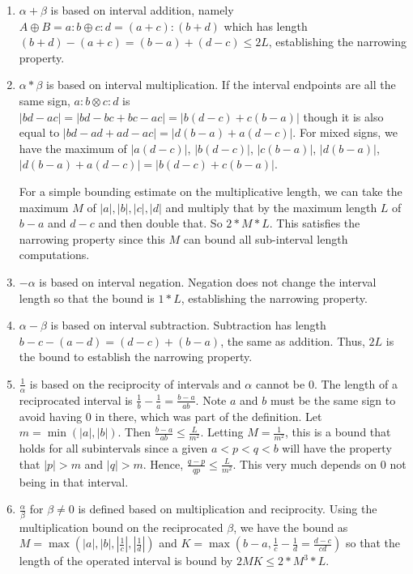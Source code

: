 \documentclass[12pt]{article}
\theoremstyle{remark}
\begin{document}
\begin{enumerate}
    \item $\alpha+\beta$ is based on interval addition, namely $A \oplus B = a:b \oplus c:d = (a+c):(b+d)$ which has length $(b+d) - (a+c) = (b-a) + (d-c) \leq 2L$, establishing the narrowing property. 
    \item $\alpha * \beta$ is based on interval multiplication. If the interval endpoints are all the same sign, $a:b \otimes c:d$ is $|bd-ac| = |bd -bc + bc -ac| =  |b(d-c) + c(b-a)|$ though it is also equal to $|bd - ad + ad - ac| = |d(b-a) + a(d-c)|$. For mixed signs, we have the maximum of $|a(d-c)|$, $|b(d-c)|$, $|c(b-a)|$, $|d(b-a)|$, $|d(b-a)+a(d-c)| = |b(d-c) + c(b-a)|$. 
    
    For a simple bounding estimate on the multiplicative length, we can take the maximum $M$ of $|a|, |b|, |c|, |d|$ and multiply that by the maximum length $L$ of $b-a$ and $d-c$ and then double that. So $2*M*L$. This satisfies the narrowing property since this $M$ can bound all sub-interval length computations.
    \item $-\alpha$ is based on interval negation. Negation does not change the interval length so that the bound is $1*L$, establishing the narrowing property. 
    \item $\alpha - \beta$ is based on interval subtraction. Subtraction has length $b-c - (a-d) = (d-c) + (b-a)$, the same as addition. Thus, $2L$ is the bound to establish the narrowing property. 
    \item $\frac{1}{\alpha}$ is based on the reciprocity of intervals and $\alpha$ cannot be $0$. The length of a reciprocated interval is $\frac{1}{b} - \frac{1}{a} = \tfrac{b-a}{ab}$. Note $a$ and $b$ must be the same sign to avoid having 0 in there, which was part of the definition. Let $m = \min(|a|, |b|)$. Then $\tfrac{b-a}{ab} \leq \tfrac{L}{m^2}$. Letting $M = \tfrac{1}{m^2}$, this is a bound that holds for all subintervals since a given $a < p < q < b$ will have the property that $|p| > m$ and $|q| > m$. Hence, $\frac{q-p}{qp} \leq \frac{L}{m^2}$. This very much depends on $0$ not being in that interval. 
    \item $\tfrac{\alpha}{\beta}$ for $\beta \neq 0$ is defined based on multiplication and reciprocity. Using the multiplication bound on the reciprocated $\beta$, we have the bound as $M = \max(|a|, |b|, |\frac{1}{c}|, |\frac{1}{d}|)$ and $K= \max(b-a, \frac{1}{c} - \frac{1}{d}= \tfrac{d-c}{cd} )$ so that the length of the operated interval is bound by $2MK \leq 2*M^3*L$.

\end{enumerate}
\end{document}
